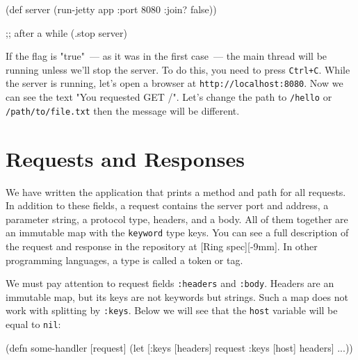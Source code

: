 \else

\begin{english}
\begin{clojure}
(def server
(run-jetty app {:port 8080 :join? false}))

;; after a while
(.stop server)
\end{clojure}
\end{english}

\fi

If the flag is "true"~--- as it was in the first case~--- the main thread will be running unless we'll stop the server. To do this, you need to press \verb|Ctrl+C|. While the server is running, let's open a browser at \verb|http://localhost:8080|. Now we can see the text "You requested GET /".  Let's change the path to \verb|/hello| or
\verb|/path/to/file.txt| then the message will be different.

\section{Requests and Responses}

We have written the application that prints a method and path for all requests. In addition to these fields, a request contains the server port and address, a parameter string, a protocol type, headers, and a body. All of them together are an immutable map with the \verb|keyword| type keys. You can see a full description of the request and response in the repository at [Ring spec][-9mm].
In other programming languages, a type is called a token or tag.


We must pay attention to request fields \verb|:headers| and \verb|:body|. Headers are an immutable map, but its keys are not keywords but strings. Such a map does not work with splitting by \verb|:keys|. Below we will see that the \verb|host| variable will be equal to \verb|nil|:


\begin{english}
\begin{clojure}
(defn some-handler
[request]
(let [{:keys [headers]} request
{:keys [host]} headers]
...))
\end{clojure}
\end{english}



